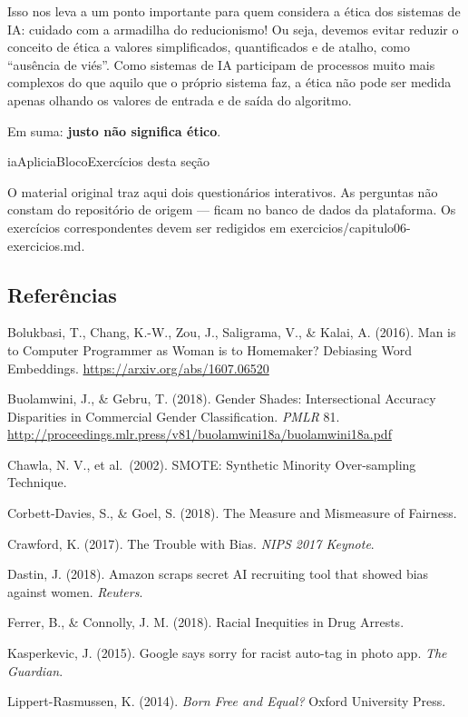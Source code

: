 \documentclass[
  11pt,
]{article}
\renewcommand{\texttt}[1]{{\color{iaAmeixa}\small\ttfamily #1}}
\newenvironment{reflexao}[1][Para pensar]{\begin{iabox}{iaAplic}{iaBloco}{#1}}{\end{iabox}}
\begin{document}
Isso nos leva a um ponto importante para quem considera a ética dos
sistemas de IA: cuidado com a armadilha do reducionismo! Ou seja,
devemos evitar reduzir o conceito de ética a valores simplificados,
quantificados e de atalho, como ``ausência de viés''. Como sistemas de
IA participam de processos muito mais complexos do que aquilo que o
próprio sistema faz, a ética não pode ser medida apenas olhando os
valores de entrada e de saída do algoritmo.

Em suma: \textbf{justo não significa ético}.

\begin{reflexao}[Exercícios desta seção]

O material original traz aqui dois questionários interativos. As
perguntas não constam do repositório de origem --- ficam no banco de
dados da plataforma. Os exercícios correspondentes devem ser redigidos
em \texttt{exercicios/capitulo06-exercicios.md}.

\end{reflexao}

\subsection{Referências}\label{referuxeancias}

Bolukbasi, T., Chang, K.-W., Zou, J., Saligrama, V., \& Kalai, A.
(2016). Man is to Computer Programmer as Woman is to Homemaker?
Debiasing Word Embeddings. \url{https://arxiv.org/abs/1607.06520}

Buolamwini, J., \& Gebru, T. (2018). Gender Shades: Intersectional
Accuracy Disparities in Commercial Gender Classification. \emph{PMLR}
81.
\url{http://proceedings.mlr.press/v81/buolamwini18a/buolamwini18a.pdf}

Chawla, N. V., et al.~(2002). SMOTE: Synthetic Minority Over-sampling
Technique.

Corbett-Davies, S., \& Goel, S. (2018). The Measure and Mismeasure of
Fairness.

Crawford, K. (2017). The Trouble with Bias. \emph{NIPS 2017 Keynote}.

Dastin, J. (2018). Amazon scraps secret AI recruiting tool that showed
bias against women. \emph{Reuters}.

Ferrer, B., \& Connolly, J. M. (2018). Racial Inequities in Drug
Arrests.

Kasperkevic, J. (2015). Google says sorry for racist auto-tag in photo
app. \emph{The Guardian}.

Lippert-Rasmussen, K. (2014). \emph{Born Free and Equal?} Oxford
University Press.
\end{document}

